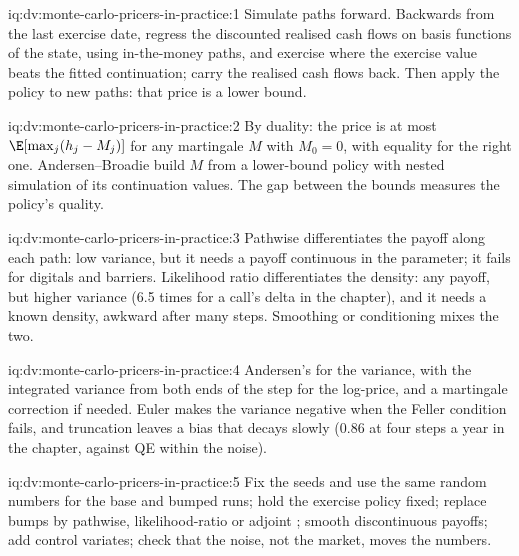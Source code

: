 \begin{solution}{iq:dv:monte-carlo-pricers-in-practice:1}
Simulate paths forward. Backwards from the last exercise date, regress the discounted realised cash flows on basis functions of the state, using
in-the-money paths, and exercise where the exercise value beats the fitted continuation; carry the realised cash flows back. Then apply the policy to new
paths: that price is a lower bound.
\end{solution}

\begin{solution}{iq:dv:monte-carlo-pricers-in-practice:2}
By duality: the price is at most $\E[\max_j(h_j-M_j)]$ for any martingale $M$ with $M_0=0$, with equality for the right one. Andersen--Broadie build $M$ from a
lower-bound policy with nested simulation of its continuation values. The gap between the bounds measures the policy's quality.
\end{solution}

\begin{solution}{iq:dv:monte-carlo-pricers-in-practice:3}
Pathwise differentiates the payoff along each path: low variance, but it needs a payoff continuous in the parameter; it fails for digitals and barriers.
Likelihood ratio differentiates the density: any payoff, but higher variance (6.5 times for a call's delta in the chapter), and it needs a known density,
awkward after many steps. Smoothing or conditioning mixes the two.
\end{solution}

\begin{solution}{iq:dv:monte-carlo-pricers-in-practice:4}
Andersen's  for the variance, with the integrated variance from both ends of the step for the log-price, and a martingale
correction if needed. Euler makes the variance negative when the Feller condition fails, and truncation leaves a bias that decays slowly (0.86 at four
steps a year in the chapter, against QE within the noise).
\end{solution}

\begin{solution}{iq:dv:monte-carlo-pricers-in-practice:5}
Fix the seeds and use the same random numbers for the base and bumped runs; hold the exercise policy fixed; replace bumps by pathwise, likelihood-ratio or
adjoint ; smooth discontinuous payoffs; add control variates; check that the noise, not the market, moves the numbers.
\end{solution}

